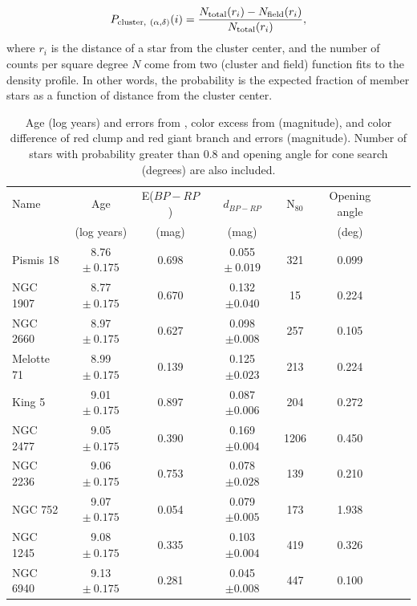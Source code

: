 \documentclass[twocolumn,times]{aastex631}
\begin{document}
$$
P_{{\rm cluster,\ }(\alpha, \delta)}(i) = \frac{N_{\rm total}(r_i) - N_{\rm field}(r_i)}{N_{\rm total}(r_i)},
$$ where $r_i$ is the distance of a star from the cluster center, and the number of counts per square degree $N$ come from two (cluster and field) function fits to the density profile. In other words, the probability is the expected fraction of member stars as a function of distance from the cluster center.

\textcolor{green}{}
\textcolor{red}{}
\begin{table}
	\centering
	\caption{Age (log years) and errors from \citet{2020A&A...640A...1C}, color excess from \citet{2013A&A...558A..53K} (magnitude), and color difference of red clump and red giant branch and errors (magnitude). Number of stars with probability greater than 0.8 and opening angle for cone search (degrees) are also included.}
	\label{tab:cluster BP-RP}
 \begin{tabular}{lccccccc}
		\hline
  Name & Age  & E($BP-RP$) & $d_{BP-RP}$  & N$_{80}$ & Opening angle \\
     & (log years) & (mag) & (mag) &  & (deg) \\
		\hline
           Pismis 18  & 8.76 $\pm \ 0.175$ & 0.698 & 0.055 $\pm \ 0.019$ & 321 & 0.099\\
           NGC 1907   & 8.77 $\pm \ 0.175$ & 0.670 & 0.132 $\pm 0.040$ & 15 & 0.224\\
           NGC 2660   & 8.97 $\pm \ 0.175$ & 0.627 & 0.098 $\pm 0.008$ & 257 & 0.105\\
           Melotte 71 & 8.99 $\pm \ 0.175$ & 0.139 & 0.125 $\pm 0.023$ & 213 & 0.224\\
            King 5    & 9.01 $\pm \ 0.175$ & 0.897 & 0.087 $\pm 0.006$ & 204 & 0.272\\
            NGC 2477  & 9.05 $\pm \ 0.175$ & 0.390 & 0.169 $\pm 0.004$ & 1206 & 0.450\\
            NGC 2236  & 9.06 $\pm \ 0.175$ & 0.753 & 0.078 $\pm 0.028$ & 139 & 0.210\\
            NGC  752  & 9.07 $\pm \ 0.175$ & 0.054 & 0.079 $\pm 0.005$ & 173 & 1.938\\
            NGC 1245  & 9.08 $\pm \ 0.175$ & 0.335 & 0.103 $\pm 0.004$ & 419 & 0.326\\
            NGC 6940  & 9.13 $\pm \ 0.175$ & 0.281 & 0.045 $\pm 0.008$ & 447 & 0.100\\

\end{tabular}
\end{table}
\end{document}
